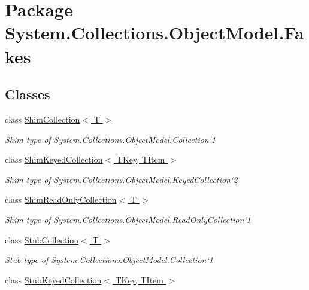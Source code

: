 \hypertarget{namespace_system_1_1_collections_1_1_object_model_1_1_fakes}{\section{Package System.\-Collections.\-Object\-Model.\-Fakes}
\label{namespace_system_1_1_collections_1_1_object_model_1_1_fakes}
}
\subsection*{Classes}
\begin{DoxyCompactItemize}
\item 
class \hyperlink{class_system_1_1_collections_1_1_object_model_1_1_fakes_1_1_shim_collection_3_01_t_01_4}{Shim\-Collection$<$ T $>$}
\begin{DoxyCompactList}\small\item\em Shim type of System.\-Collections.\-Object\-Model.\-Collection`1\end{DoxyCompactList}\item 
class \hyperlink{class_system_1_1_collections_1_1_object_model_1_1_fakes_1_1_shim_keyed_collection_3_01_t_key_00_01_t_item_01_4}{Shim\-Keyed\-Collection$<$ T\-Key, T\-Item $>$}
\begin{DoxyCompactList}\small\item\em Shim type of System.\-Collections.\-Object\-Model.\-Keyed\-Collection`2\end{DoxyCompactList}\item 
class \hyperlink{class_system_1_1_collections_1_1_object_model_1_1_fakes_1_1_shim_read_only_collection_3_01_t_01_4}{Shim\-Read\-Only\-Collection$<$ T $>$}
\begin{DoxyCompactList}\small\item\em Shim type of System.\-Collections.\-Object\-Model.\-Read\-Only\-Collection`1\end{DoxyCompactList}\item 
class \hyperlink{class_system_1_1_collections_1_1_object_model_1_1_fakes_1_1_stub_collection_3_01_t_01_4}{Stub\-Collection$<$ T $>$}
\begin{DoxyCompactList}\small\item\em Stub type of System.\-Collections.\-Object\-Model.\-Collection`1\end{DoxyCompactList}\item 
class \hyperlink{class_system_1_1_collections_1_1_object_model_1_1_fakes_1_1_stub_keyed_collection_3_01_t_key_00_01_t_item_01_4}{Stub\-Keyed\-Collection$<$ T\-Key, T\-Item $>$}

\end{DoxyCompactItemize}
